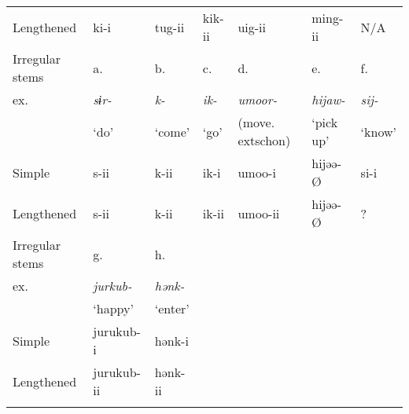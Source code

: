 \begin{tabularx}{\textwidth}{XXXXXXX}
Lengthened & ki-i & tug-ii & kik-ii & uig-ii & ming-ii & N/A\\
Irregular stems & a. & b. & c. & d. & e. & f.\\
ex. & {\itshape sɨr-} & {\itshape k-} & {\itshape ik-} & {\itshape umoor-} & {\itshape hijaw-} & {\itshape sij-}\\
& ‘do’ & ‘come’ & ‘go’ & (move.	extsc{hon}) & ‘pick up’ & ‘know’\\
Simple & s-ii & k-ii & ik-i & umoo-i & hijəə-Ø & si-i\\
Lengthened & s-ii & k-ii & ik-ii & umoo-ii & hijəə-Ø & ?\\
Irregular stems & g. & h. &  &  &  & \\
ex. & {\itshape jurkub-} & {\itshape hənk-} &  &  &  & \\
& ‘happy’ & ‘enter’ &  &  &  & \\
Simple & jurukub-i & hənk-i &  &  &  & \\
Lengthened & jurukub-ii & hənk-ii &  &  &  & \\
\lspbottomrule
\end{tabularx}
